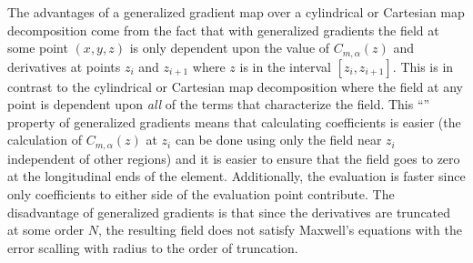 The advantages of a generalized gradient map over a cylindrical or Cartesian map decomposition come
from the fact that with generalized gradients the field at some point $(x,y,z)$ is only dependent
upon the value of $C_{m,\alpha}(z)$ and derivatives at points $z_i$ and $z_{i+1}$ where $z$ is in
the interval $[z_i, z_{i+1}]$. This is in contrast to the cylindrical or Cartesian map decomposition
where the field at any point is dependent upon {\em all} of the terms that characterize the
field. This ``'' property of generalized gradients means that calculating coefficients
is easier (the calculation of $C_{m,\alpha}(z)$ at $z_i$ can be done using only the field near $z_i$
independent of other regions) and it is easier to ensure that the field goes to zero at the
longitudinal ends of the element. Additionally, the evaluation is faster since only coefficients to
either side of the evaluation point contribute. The disadvantage of generalized gradients is that
since the derivatives are truncated at some order $N$, the resulting field does not satisfy
Maxwell's equations with the error scalling with radius to the order of truncation.

